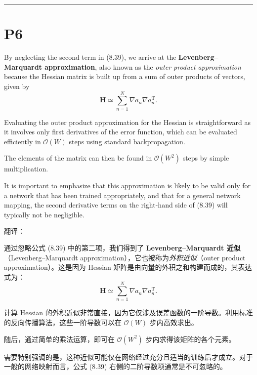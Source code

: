 \documentclass{article}
\begin{document}
\noindent\rule{\linewidth}{0.4pt}

\section{P6}

By neglecting the second term in (8.39), we arrive at the \textbf{Levenberg--Marquardt approximation}, also known as the \textit{outer product approximation} because the Hessian matrix is built up from a sum of outer products of vectors, given by
\begin{equation}
    \mathbf{H} \simeq \sum_{n=1}^N \nabla a_n \nabla a_n^\mathrm{T}.
    \tag{8.40}
\end{equation}

Evaluating the outer product approximation for the Hessian is straightforward as it involves only first derivatives of the error function, which can be evaluated efficiently in $\mathcal{O}(W)$ steps using standard backpropagation. 

The elements of the matrix can then be found in $\mathcal{O}(W^2)$ steps by simple multiplication. 

It is important to emphasize that this approximation is likely to be valid only for a network that has been trained appropriately, and that for a general network mapping, the second derivative terms on the right-hand side of (8.39) will typically not be negligible.


{\color{red}
翻译：

通过忽略公式 (8.39) 中的第二项，我们得到了 \textbf{Levenberg--Marquardt 近似}（Levenberg--Marquardt approximation），它也被称为\textit{外积近似}（outer product approximation）。这是因为 Hessian 矩阵是由向量的外积之和构建而成的，其表达式为：
\begin{equation}
    \mathbf{H} \simeq \sum_{n=1}^N \nabla a_n \nabla a_n^\mathrm{T}.
    \tag{8.40}
\end{equation}

计算 Hessian 的外积近似非常直接，因为它仅涉及误差函数的一阶导数。利用标准的反向传播算法，这些一阶导数可以在 $\mathcal{O}(W)$ 步内高效求出。

随后，通过简单的乘法运算，即可在 $\mathcal{O}(W^2)$ 步内求得该矩阵的各个元素。

需要特别强调的是，这种近似可能仅在网络经过充分且适当的训练后才成立。对于一般的网络映射而言，公式 (8.39) 右侧的二阶导数项通常是不可忽略的。
}
\end{document}
